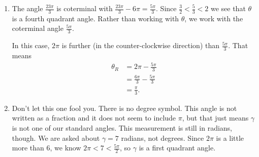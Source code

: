\documentclass[nooutcomes]{ximera}
\begin{document}
\begin{exercise}
\begin{explanation}
\begin{enumerate}
			\item The angle $\frac{23\pi}{3}$ is coterminal with $\frac{23\pi}{3}-6\pi = \frac{5\pi}{3}$. Since $\frac{3}{2} < \frac{5}{3} < 2$ we see
				that $\theta$ is a fourth quadrant angle. Rather than working with $\theta$, we work with the coterminal angle $\frac{5\pi}{3}$.

				\begin{image}
				\end{image}
				In this case, $2\pi$ is further (in the counter-clockwise direction) than $\frac{5\pi}{3}$. That means
				\begin{align*}
					\theta_R &=2\pi - \frac{5\pi}{3} \\
						&= \frac{6\pi}{3}- \frac{5\pi}{3}\\
						&= \frac{\pi}{3}.
				\end{align*}

			\item Don't let this one fool you. There is no degree symbol. This angle is not written as a fraction and it does not seem to include $\pi$, but that just
			means $\gamma$ is not one of our standard angles. This measurement is still in radians, though. 
			We are asked about $\gamma = 7$ radians, not degrees. Since $2\pi$ is a little more than $6$, we know 
			$2\pi < 7 < \frac{5\pi}{2}$, so $\gamma$ is a first quadrant angle.


\end{enumerate}
\end{explanation}
\end{exercise}
\end{document}
